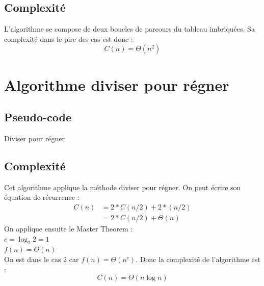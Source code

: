 \documentclass[11pt, a4paper]{article}
\begin{document}
\subsection{Complexité}
L'algorithme se compose de deux boucles de parcours du tableau imbriquées. Sa
complexité dans le pire des cas est donc :
\[C(n) = \Theta{(n^2)}\]

\section{Algorithme diviser pour régner}
\subsection{Pseudo-code}

\begin{algorithm}[H]
  \caption{Diviser pour régner}
\end{algorithm}
\subsection{Complexité}
Cet algorithme applique la méthode diviser pour régner. On peut écrire son
équation de récurrence :
\begin{align*}
  C(n) & = 2*C(n/2) + 2*(n/2) \\
       & = 2*C(n/2) + \Theta{(n)}
\end{align*}
On applique ensuite le Master Theorem : \\
$c = \log_2 2 = 1$ \\
$f(n) = \Theta{(n)}$ \\
On est dans le cas 2 car $f(n) = \Theta{(n^c)}$. Donc la complexité de
l'algorithme est :
\[ C(n) = \Theta{(n \log n)} \]
\end{document}
